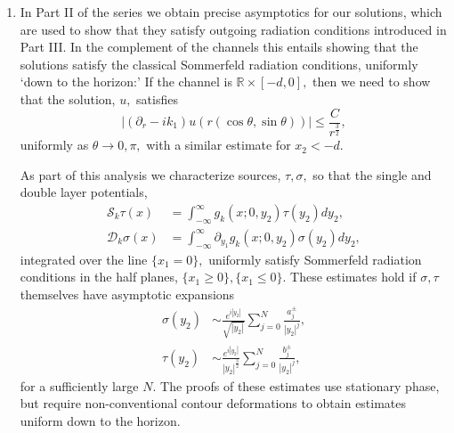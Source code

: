 \documentclass[11pt]{article}
\newcommand\cS{\mathcal{S}}
\newcommand\cD{\mathcal{D}}
\newcommand\bbR{\mathbb R}
\newcommand\pa{\partial}
\theoremstyle{definition}
\theoremstyle{remark}
\begin{document}
\begin{enumerate}

\item In Part II of the series we obtain precise asymptotics for our solutions,
  which are used to show that they satisfy outgoing radiation conditions
  introduced in Part III. In the complement of the channels this entails showing
  that the solutions satisfy the classical Sommerfeld radiation conditions,
  uniformly `down to the horizon:' If the channel is $\bbR\times [-d,0],$ then
  we need to show that the solution, $u,$ satisfies
 \begin{equation}
   |(\pa_r-ik_1)u(r(\cos\theta,\sin\theta))|\leq\frac{C}{r^{\frac 32}},
 \end{equation}
 uniformly as $\theta\to 0,\pi,$ with a similar estimate for $x_2<-d.$

 As part of this analysis we characterize sources, $\tau, \sigma,$ so that the
 single and double layer potentials,
 \begin{equation}
   \begin{split}
   \cS_k\tau(x)&=\int_{-\infty}^{\infty}g_k(x;0,y_2)\tau(y_2)dy_2,\\
   \cD_k\sigma(x)&=\int_{-\infty}^{\infty}\pa_{y_1}g_k(x;0,y_2)\sigma(y_2)dy_2,
   \end{split}
 \end{equation}
 integrated over the  line $\{x_1=0\},$
 uniformly satisfy Sommerfeld radiation conditions in the half planes, $\{x_1\geq 0\},
 \{x_1\leq 0\}.$ These estimates hold if $\sigma, \tau$ themselves have
 asymptotic expansions
 \begin{equation}
   \begin{split}
     \sigma(y_2)&\sim
     \frac{e^{i|y_2|}}{\sqrt{|y_2|}}\sum_{j=0}^{N}\frac{a_j^{\pm}}{|y_2|^j},\\
         \tau(y_2)&\sim \frac{e^{i|y_2|}}{|y_2|^{\frac 32}}\sum_{j=0}^{N}\frac{b_j^{\pm}}{|y_2|^j},
   \end{split}
 \end{equation}
 for a sufficiently large $N.$ The proofs of these estimates use stationary
 phase, but require  non-conventional contour deformations to obtain estimates
 uniform down to the horizon. 
  

\end{enumerate}
\end{document}
